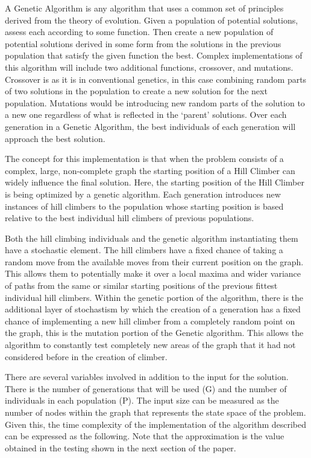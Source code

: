 \documentclass[sigplan,screen]{acmart}
\begin{document}
A Genetic Algorithm is any algorithm that uses a common set of principles
derived from the theory of evolution. Given a population of potential solutions,
assess each according to some function. Then create a new population of
potential solutions derived in some form from the solutions in the previous
population that satisfy the given function the best. Complex implementations of
this algorithm will include two additional functions, crossover, and mutations.
Crossover is as it is in conventional genetics, in this case combining random
parts of two solutions in the population to create a new solution for the next
population. Mutations would be introducing new random parts of the solution to a
new one regardless of what is reflected in the ‘parent’ solutions. Over each
generation in a Genetic Algorithm, the best individuals of each generation will
approach the best solution.

The concept for this implementation is that when the problem consists of a
complex, large, non-complete graph the starting position of a Hill Climber can
widely influence the final solution. Here, the starting position of the Hill
Climber is being optimized by a genetic algorithm. Each generation introduces
new instances of hill climbers to the population whose starting position is
based relative to the best individual hill climbers of previous populations.

Both the hill climbing individuals and the genetic algorithm instantiating them
have a stochastic element. The hill climbers have a fixed chance of taking a
random move from the available moves from their current position on the graph.
This allows them to potentially make it over a local maxima and wider variance
of paths from the same or similar starting positions of the previous fittest
individual hill climbers. Within the genetic portion of the algorithm, there is
the additional layer of stochastism by which the creation of a generation has a
fixed chance of implementing a new hill climber from a completely random point
on the graph, this is the mutation portion of the Genetic algorithm. This allows
the algorithm to constantly test completely new areas of the graph that it had
not considered before in the creation of climber.

There are several variables involved in addition to the input for the solution.
There is the number of generations that will be used (G) and the number of
individuals in each population (P). The input size can be measured as the number
of nodes within the graph that represents the state space of the problem. Given
this, the time complexity of the implementation of the algorithm described can
be expressed as the following. Note that the approximation is the value obtained
in the testing shown in the next section of the paper.
\end{document}
